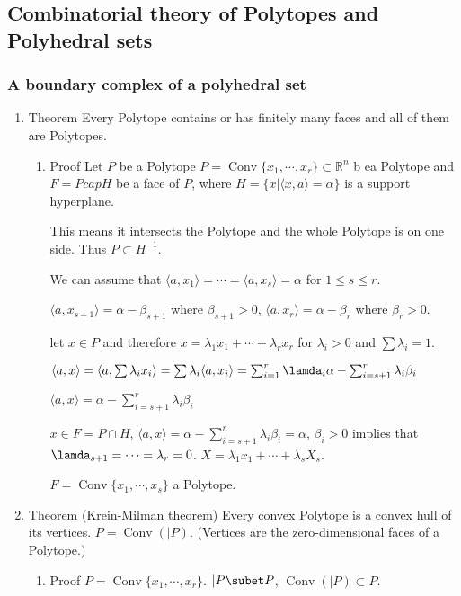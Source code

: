 \documentclass[11pt]{article}
\def\R{\mathbb{R}}
\def\conv{\operatorname{Conv}}
\begin{document}
\subsection{Combinatorial theory of Polytopes and Polyhedral sets}
\label{sec:orgf4f36bc}
\subsubsection{A boundary complex of a polyhedral set}
\label{sec:orge8ab73f}
\begin{enumerate}
\item Theorem
\label{sec:orgaf67d02}
Every Polytope contains or has finitely many faces and all of them are
Polytopes.
\begin{enumerate}
\item Proof
\label{sec:org8eb5821}
Let \(P\) be a Polytope \(P = \conv\{x_1, \cdots, x_r\} \subset \R^n\) b ea
Polytope and \(F = P cap H\) be a face of \(P\), where \(H = \{x \vert \langle
      x, a \rangle = \alpha \}\) is a support hyperplane.

This means it intersects the Polytope and the whole Polytope is on one
side. Thus \(P \subset H^{-1}\).

We can assume that \(\langle a, x_1 \rangle = \cdots = \langle a,
      x_s\rangle = \alpha\) for \(1\le s \le r\).

\(\langle a, x_{s+1}\rangle = \alpha - \beta_{s+1}\) where \(\beta_{s+1} >
      0\), \(\langle a, x_r \rangle = \alpha - \beta_r\) where \(\beta_r > 0\).

let \(x\in P\) and therefore \(x = \lambda_1 x_1 + \cdots + \lambda_r x_r\)
for \(\lambda_i > 0\) and \(\sum \lambda_i = 1\).

\(\langle a, x\rangle = \langle a, \sum \lambda_i x_i \rangle = \sum
      \lambda_i \langle a, x_i \rangle = \sum_{i=1}^{r} \lamda_i \alpha -
      \sum_{i=s+1}^{r} \lambda_i \beta_i\)

\(\langle a, x \rangle = \alpha - \sum_{i=s+1}^{r} \lambda_i \beta_i\)

\(x \in F = P \cap H\), \(\langle a, x\rangle = \alpha - \sum_{i=s+1}^{r}
      \lambda_i \beta_i = \alpha\), \(\beta_i > 0\) implies that \(\lamda_{s+1}=
      \cdots = \lambda_r = 0\). \(X = \lambda_1 x_1 + \cdots + \lambda_s X_s\).

\(F = \conv \{x_1, \cdots, x_s\}\) a Polytope.
\end{enumerate}
\item Theorem (Krein-Milman theorem)
\label{sec:orgb8be58c}
Every convex Polytope is a convex hull of its vertices. \(P = \conv(\vert
     P)\). (Vertices are the zero-dimensional faces of a Polytope.)
\begin{enumerate}
\item Proof
\label{sec:org716b8b0}
\(P = \conv\{x_1, \cdots, x_r\}\). \(\vert P \subet P\), \(\conv (\vert P)
      \subset P\).


\end{enumerate}
\end{enumerate}
\end{document}
